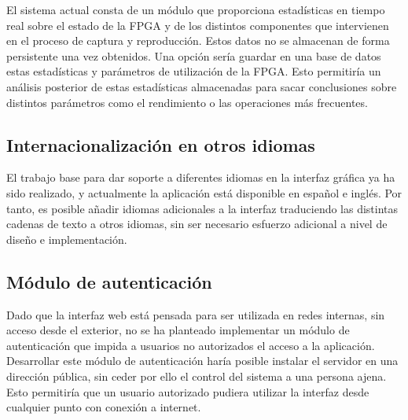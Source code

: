 El sistema actual consta de un módulo que proporciona estadísticas en tiempo real sobre el estado de la \gls{FPGA} y de los distintos componentes que intervienen en el proceso de captura y reproducción. Estos datos no se almacenan de forma persistente una vez obtenidos. Una opción sería guardar en una base de datos estas estadísticas y parámetros de utilización de la \gls{FPGA}. Esto permitiría un análisis posterior de estas estadísticas almacenadas para sacar conclusiones sobre distintos parámetros como el rendimiento o las operaciones más frecuentes.


\subsection*{Internacionalización en otros idiomas}

El trabajo base para dar soporte a diferentes idiomas en la interfaz gráfica ya ha sido realizado, y actualmente la aplicación está disponible en español e inglés. Por tanto, es posible añadir idiomas adicionales a la interfaz traduciendo las distintas cadenas de texto a otros idiomas, sin ser necesario esfuerzo adicional a nivel de diseño e implementación.


\subsection*{Módulo de autenticación}

Dado que la interfaz web está pensada para ser utilizada en redes internas, sin acceso desde el exterior, no se ha planteado implementar un módulo de autenticación que impida a usuarios no autorizados el acceso a la aplicación. Desarrollar este módulo de autenticación haría posible instalar el servidor en una dirección pública, sin ceder por ello el control del sistema a una persona ajena. Esto permitiría que un usuario autorizado pudiera utilizar la interfaz desde cualquier punto con conexión a internet.
